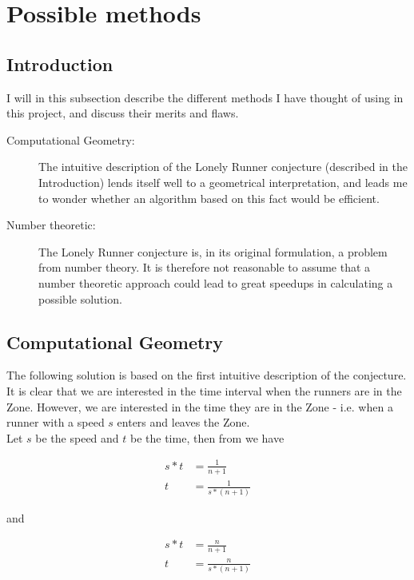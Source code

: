 \section{Possible methods}
\label{choiceOfMethod}

\subsection{Introduction}
I will in this subsection describe the different methods I have thought of using in this project, and discuss their merits and flaws.

\begin{description}
\item[Computational Geometry:] The intuitive description of the Lonely Runner conjecture (described in the Introduction) lends itself well to a geometrical interpretation, and leads me to wonder whether an algorithm based on this fact would be efficient.

\item[Number theoretic:] The Lonely Runner conjecture is, in its original formulation, a problem from number theory. It is therefore not reasonable to assume that a number theoretic approach could lead to great speedups in calculating a possible solution.
\end{description}

\subsection{Computational Geometry}

The following solution is based on the first intuitive description of the conjecture. It is clear that we are interested in the time interval when the runners are in the Zone. However, we are interested in the time they are in the Zone - i.e. when a runner with a speed $s$ enters and leaves the Zone.\\ 

Let $s$ be the speed and $t$ be the time, then from  we have 

\begin{equation}
\label{eqa:speedOne}
\begin{split}
s * t &= \frac{1}{n+1} \\
t &= \frac{1}{s * (n+1)}
\end{split}
\end{equation}

and 

\begin{equation}
\label{eqa:speedTwo}
\begin{split}
s * t &= \frac{n}{n+1} \\
t &= \frac{n}{s * (n+1)}
\end{split}
\end{equation}

